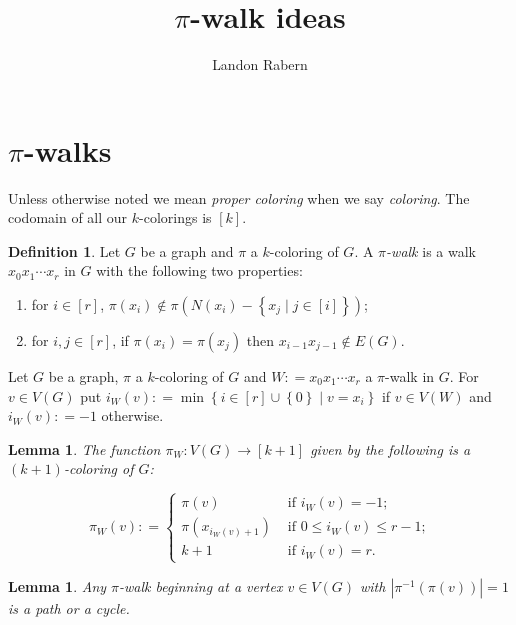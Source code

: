 \documentclass[12pt]{amsart}
\title{$\pi$-walk ideas}
\author{Landon Rabern}
\theoremstyle{plain}
\newtheorem{lem}[thm]{Lemma}
\theoremstyle{definition}
\newtheorem{defn}{Definition}
\theoremstyle{remark}
\newcommand{\set}[1]{\left\{ #1 \right\}}
\newcommand{\setbs}[2]{\left\{ #1 \mid #2 \right\}}
\newcommand{\card}[1]{\left|#1\right|}
\newcommand{\func}[3]{#1\colon #2 \rightarrow #3}
\newcommand{\irange}[1]{\left[#1\right]}
\newcommand{\parens}[1]{\left( #1 \right)}
\newcommand{\DefinedAs}{\mathrel{\mathop:}=}
\begin{document}
\begin{abstract}
\end{abstract}
\maketitle

\section{$\pi$-walks}
\noindent Unless otherwise noted we mean \emph{proper coloring} when we say \emph{coloring}.  The codomain of all our $k$-colorings is $\irange{k}$.

\begin{defn}
Let $G$ be a graph and $\pi$ a $k$-coloring of $G$.  A \emph{$\pi$-walk} is a walk $x_0x_1\cdots x_r$ in $G$ with the following two properties:

\begin{enumerate}
\item for $i \in \irange{r}$, $\pi(x_i) \not \in \pi\parens{N(x_i) - \setbs{x_j}{j \in \irange{i}}}$;
\item for $i,j \in \irange{r}$, if $\pi(x_i) = \pi(x_j)$ then $x_{i-1}x_{j-1} \not \in E(G)$.
\end{enumerate}
\end{defn}

\noindent Let $G$ be a graph, $\pi$ a $k$-coloring of $G$ and $W \DefinedAs x_0x_1\cdots x_r$ a $\pi$-walk in $G$. For $v \in V(G)$ put $i_W(v) \DefinedAs \min \setbs{i \in \irange{r} \cup \set{0}}{v = x_i}$ if $v \in V(W)$ and $i_W(v) \DefinedAs -1$ otherwise.

\begin{lem}
The function $\func{\pi_W}{V(G)}{\irange{k+1}}$ given by the following is a $(k+1)$-coloring of $G$:

\[\pi_W(v) \DefinedAs \begin{cases}
\pi(v) & \text{ if $i_W(v) = -1$;} \\
\pi(x_{i_W(v) + 1}) & \text{ if $0 \leq i_W(v) \leq r-1$;} \\
k+1 & \text{ if $i_W(v) = r$.}
\end{cases}\]
\end{lem}

\begin{lem}
Any $\pi$-walk beginning at a vertex $v \in V(G)$ with $\card{\pi^{-1}(\pi(v))} = 1$ is a path or a cycle.
\end{lem}
\end{document}
